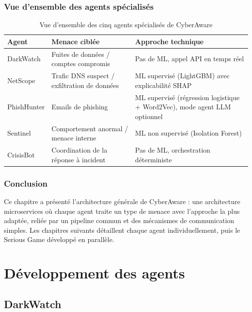 \documentclass[12pt,a4paper]{report}
\begin{document}
\section{Vue d'ensemble des agents spécialisés}

\begin{table}[H]
\centering
\small
\begin{tabular}{@{}>{\raggedright\arraybackslash}p{2.3cm}>{\raggedright\arraybackslash}p{5.3cm}>{\raggedright\arraybackslash}p{5.3cm}@{}}
\toprule
\textbf{Agent} & \textbf{Menace ciblée} & \textbf{Approche technique} \\
\midrule
DarkWatch & Fuites de données / comptes compromis & Pas de ML, appel API en temps réel \\
NetScope & Trafic DNS suspect / exfiltration de données & ML supervisé (LightGBM) avec explicabilité SHAP \\
PhishHunter & Emails de phishing & ML supervisé (régression logistique + Word2Vec), mode agent LLM optionnel \\
Sentinel & Comportement anormal / menace interne & ML non supervisé (Isolation Forest) \\
CrisisBot & Coordination de la réponse à incident & Pas de ML, orchestration déterministe \\
\bottomrule
\end{tabular}
\caption{Vue d'ensemble des cinq agents spécialisés de CyberAware}
\end{table}

\section{Conclusion}

Ce chapitre a présenté l'architecture générale de CyberAware : une architecture microservices où chaque agent traite un type de menace avec l'approche la plus adaptée, reliée par un pipeline commun et des mécanismes de communication simples. Les chapitres suivants détaillent chaque agent individuellement, puis le Serious Game développé en parallèle.

\part{Développement des agents}

\chapter{DarkWatch}
\end{document}

